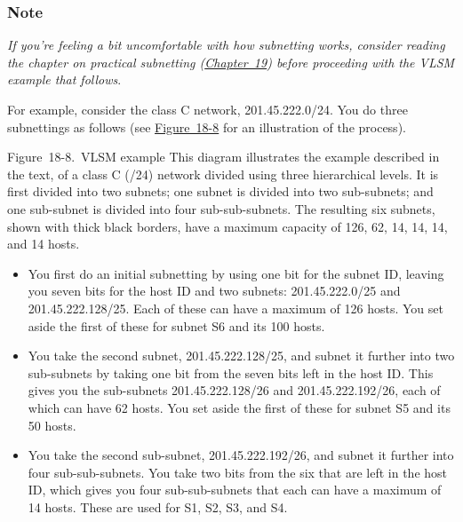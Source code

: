 \subsubsection[Note]{\texorpdfstring{\protect\hypertarget{ch18s08.htmlux5cux23note-75}{}{}Note}{Note}}

{\emph{If you're feeling a bit uncomfortable with how subnetting works,
consider reading the chapter on practical subnetting
(\protect\hyperlink{ch19.html}{Chapter~19}) before proceeding with the
VLSM example that follows}}.

For example, consider the class C network, 201.45.222.0/24. You do three
subnettings as follows (see
\protect\hyperlink{ch18s08.htmlux5cux23vlsm_example_this_diagram_illustrates_th}{Figure~18-8}
for an illustration of the process).

\protect\hypertarget{ch18s08.htmlux5cux23vlsm_example_this_diagram_illustrates_th}{}{}

\protect\hypertarget{ch18s08.htmlux5cux23I_mediaobject4_d1e20490}{}{}

Figure~18-8.~VLSM example This diagram illustrates the example described
in the text, of a class C (/24) network divided using three hierarchical
levels. It is first divided into two subnets; one subnet is divided into
two sub-subnets; and one sub-subnet is divided into four
sub-sub-subnets. The resulting six subnets, shown with thick black
borders, have a maximum capacity of 126, 62, 14, 14, 14, and 14 hosts.

\begin{itemize}
\item
  You first do an initial subnetting by using one bit for the subnet ID,
  leaving you seven bits for the host ID and two subnets:
  201.45.222.0/25 and 201.45.222.128/25. Each of these can have a
  maximum of 126 hosts. You set aside the first of these for subnet S6
  and its 100 hosts.
\item
  You take the second subnet, 201.45.222.128/25, and subnet it further
  into two sub-subnets by taking one bit from the seven bits left in the
  host ID. This gives you the sub-subnets 201.45.222.128/26 and
  201.45.222.192/26, each of which can have 62 hosts. You set aside the
  first of these for subnet S5 and its 50 hosts.
\item
  You take the second sub-subnet, 201.45.222.192/26, and subnet it
  further into four sub-sub-subnets. You take two bits from the six that
  are left in the host ID, which gives you four sub-sub-subnets that
  each can have a maximum of 14 hosts. These are used for S1, S2, S3,
  and S4.
\end{itemize}

